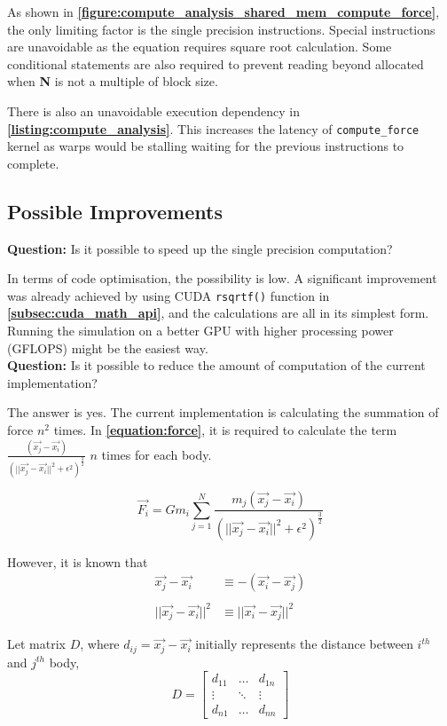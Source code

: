 \documentclass[12pt, a4paper]{article}
\let\oldcref\cref
\renewcommand{\cref}[1]{\textbf{\oldcref{#1}}}
\begin{document}
As shown in \cref{figure:compute_analysis_shared_mem_compute_force}, the only limiting factor is the
single precision instructions. Special instructions are unavoidable as the equation requires square
root calculation. Some conditional statements are also required to prevent reading beyond allocated
when \textbf{N} is not a multiple of block size.

There is also an unavoidable execution dependency in \cref{listing:compute_analysis}. This increases
the latency of \texttt{compute\_force} kernel as warps would be stalling waiting for the previous
instructions to complete.

\subsection{Possible Improvements}
\noindent \textbf{Question:} Is it possible to speed up the single precision computation?

In terms of code optimisation, the possibility is low. A significant improvement was already
achieved by using CUDA \texttt{rsqrtf()} function in \cref{subsec:cuda_math_api}, and the
calculations are all in its simplest form. Running the simulation on a better GPU with higher
processing power (GFLOPS) might be the easiest way. \\[8pt]


\noindent \textbf{Question:} Is it possible to reduce the amount of computation of the current
implementation?

The answer is yes. The current implementation is calculating the summation of force \(n^2\) times.
In \cref{equation:force}, it is required to calculate the term \(\frac{(\vec{x_j} -
\vec{x_i})}{(||\vec{x_j} - \vec{x_i}||^2 + \epsilon^2)^\frac{3}{2}}\) \(n\) times for each body.

\begin{equation}
  \vec{F_i} = Gm_i \sum_{j=1}^{N} \frac{m_j(\vec{x_j} - \vec{x_i})}{(||\vec{x_j} - \vec{x_i}||^2 + \epsilon^2)^\frac{3}{2}}
  \label{equation:force}
\end{equation}

However, it is known that
\begin{align}
\vec{x_j} - \vec{x_i}       &\equiv -(\vec{x_i} - \vec{x_j}) \\
\nonumber \\
||\vec{x_j} - \vec{x_i}||^2 &\equiv ||\vec{x_i} - \vec{x_j}||^2
\end{align}

Let matrix \(D\), where \(d_{ij} = \vec{x_j} - \vec{x_i}\) initially represents the distance between
\(i^{th}\) and \(j^{th}\) body,
\[
D = \begin{bmatrix}
    d_{11} & \dots  & d_{1n} \\
    \vdots & \ddots & \vdots \\
    d_{n1} & \dots  & d_{nn}
    \end{bmatrix}
\]
\end{document}

